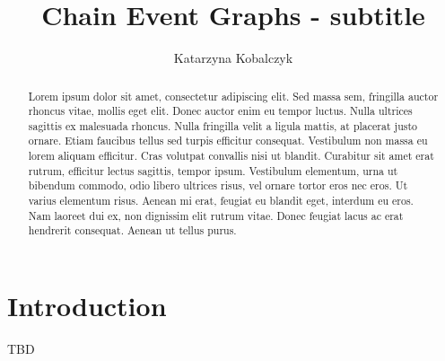 \documentclass[runningheads]{llncs}
\begin{document}
\title{Chain Event Graphs - subtitle}


%
%
\author{Katarzyna Kobalczyk}
%
%

%
\maketitle
%
\begin{abstract}
Lorem ipsum dolor sit amet, consectetur adipiscing elit. Sed massa sem, fringilla auctor rhoncus vitae, mollis eget elit. Donec auctor enim eu tempor luctus. Nulla ultrices sagittis ex malesuada rhoncus. Nulla fringilla velit a ligula mattis, at placerat justo ornare. Etiam faucibus tellus sed turpis efficitur consequat. Vestibulum non massa eu lorem aliquam efficitur. Cras volutpat convallis nisi ut blandit. Curabitur sit amet erat rutrum, efficitur lectus sagittis, tempor ipsum. Vestibulum elementum, urna ut bibendum commodo, odio libero ultrices risus, vel ornare tortor eros nec eros. Ut varius elementum risus. Aenean mi erat, feugiat eu blandit eget, interdum eu eros. Nam laoreet dui ex, non dignissim elit rutrum vitae. Donec feugiat lacus ac erat hendrerit consequat. Aenean ut tellus purus.

\end{abstract}

%
%
%
\section{Introduction}
TBD

%
%
\end{document}
